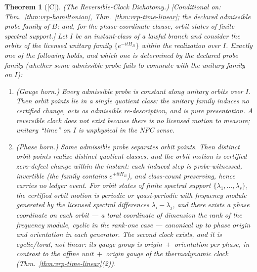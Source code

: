 \documentclass[12pt,oneside]{amsbook}
\theoremstyle{plain}
\newtheorem{theorem}{Theorem}[section]
\theoremstyle{definition}
\theoremstyle{remark}
\newcommand{\status}[1]{\textup{[#1]}}
\begin{document}
\begin{theorem}[\status{C}]\label{thm:vrp-reversible-dichotomy}
\textup{(The Reversible-Clock Dichotomy.)}
\textup{[Conditional on: Thm.~\ref{thm:vrp-hamiltonian},
Thm.~\ref{thm:vrp-time-linear}; the declared admissible probe
family of $B$; and, for the phase-coordinate clause, orbit states
of finite spectral support.]}
Let $I$ be an instant-class of a lawful branch and consider the
orbits of the licensed unitary family $\{e^{-itH_B}\}$ within the
realization over $I$.  Exactly one of the following holds, and
which one is determined by the declared probe family (whether some
admissible probe fails to commute with the unitary family on
$I$):
\begin{enumerate}[label=\textup{(\Roman*)}]
  \item \emph{(Gauge horn.)}  Every admissible probe is constant
    along unitary orbits over $I$.  Then orbit points lie in a
    single quotient class: the unitary family induces no certified
    change, acts as admissible re-description, and is pure
    presentation.  A reversible clock does not exist because there
    is no licensed motion to measure; unitary ``time'' on $I$ is
    unphysical in the NFC sense.
  \item \emph{(Phase horn.)}  Some admissible probe separates
    orbit points.  Then distinct orbit points realize distinct
    quotient classes, and the orbit motion is certified
    \emph{zero-defect} change within the instant: each induced
    step is probe-witnessed, invertible (the family contains
    $e^{+itH_B}$), and class-count preserving, hence carries no
    ledger event.  For orbit states of finite spectral support
    $\{\lambda_1, \dots, \lambda_r\}$, the certified orbit motion
    is periodic or quasi-periodic with frequency module generated
    by the licensed spectral differences
    $\lambda_i - \lambda_j$, and there exists a \emph{phase
    coordinate} on each orbit --- a toral coordinate of dimension
    the rank of the frequency module, cyclic in the rank-one case
    --- canonical up to phase origin and orientation in each
    generator.  The second clock exists, and it is cyclic/toral,
    not linear: its gauge group is origin~$+$~orientation per
    phase, in contrast to the affine unit~$+$~origin gauge of the
    thermodynamic clock
    (Thm.~\ref{thm:vrp-time-linear}(2)).
\end{enumerate}
\end{theorem}
\end{document}
